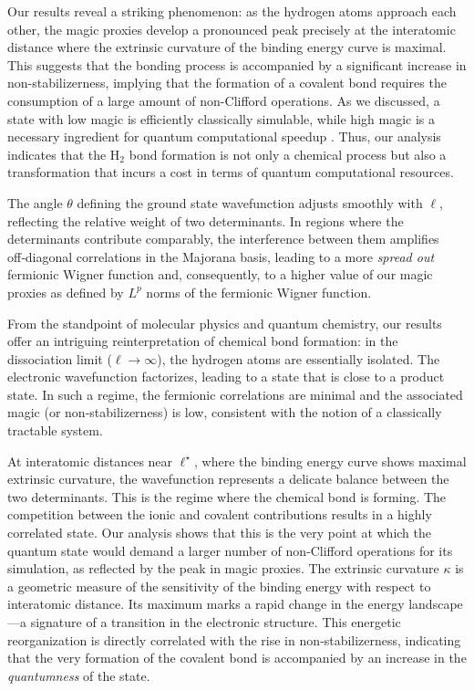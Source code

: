 \documentclass[aps, prl, twocolumn, groupedaddress, reprint, floatfix, nofootinbib, longbibliography]{revtex4-2}
\begin{document}
        Our results reveal a striking phenomenon: as the hydrogen atoms approach each other, the magic proxies develop a pronounced peak precisely at the interatomic distance where the extrinsic curvature of the binding energy curve is maximal. This suggests that the bonding process is accompanied by a significant increase in non-stabilizerness, implying that the formation of a covalent bond requires the consumption of a large amount of non-Clifford operations. As we discussed, a state with low magic is efficiently classically simulable, while high magic is a necessary ingredient for quantum computational speedup \cite{howard2014contextuality,Veitch2014Resource}. Thus, our analysis indicates that the H$_2$ bond formation is not only a chemical process but also a transformation that incurs a cost in terms of quantum computational resources.

        The angle $\theta$ defining the ground state wavefunction adjusts smoothly with $\ell$, reflecting the relative weight of two determinants. In regions where the determinants contribute comparably, the interference between them amplifies off‑diagonal correlations in the Majorana basis, leading to a more \textit{spread out} fermionic Wigner function and, consequently, to a higher value of our magic proxies as defined by $L^p$ norms of the fermionic Wigner function.

        From the standpoint of molecular physics and quantum chemistry, our results offer an intriguing reinterpretation of chemical bond formation: in the dissociation limit ($\ell\to\infty$), the hydrogen atoms are essentially isolated. The electronic wavefunction factorizes, leading to a state that is close to a product state. In such a regime, the fermionic correlations are minimal and the associated magic (or non‑stabilizerness) is low, consistent with the notion of a classically tractable system.

        At interatomic distances near $\ell^\star$, where the binding energy curve shows maximal extrinsic curvature, the wavefunction represents a delicate balance between the two determinants. This is the regime where the chemical bond is forming. The competition between the ionic and covalent contributions results in a highly correlated state. Our analysis shows that this is the very point at which the quantum state would demand a larger number of non‑Clifford operations for its simulation, as reflected by the peak in magic proxies. The extrinsic curvature $\kappa$ is a geometric measure of the sensitivity of the binding energy with respect to interatomic distance. Its maximum marks a rapid change in the energy landscape—a signature of a transition in the electronic structure. This energetic reorganization is directly correlated with the rise in non‑stabilizerness, indicating that the very formation of the covalent bond is accompanied by an increase in the \textit{quantumness} of the state.
\end{document}

